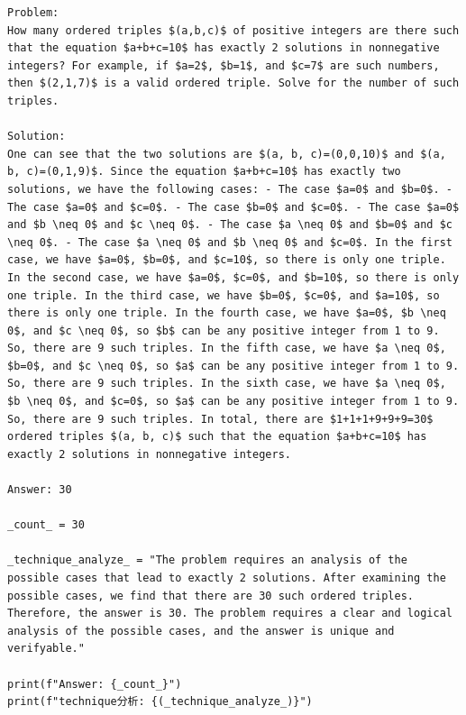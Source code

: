 \documentclass[11pt]{article}
\begin{document}
\begin{Verbatim}[breaklines=true,breakanywhere=true,fontsize=\small]
Problem:
How many ordered triples $(a,b,c)$ of positive integers are there such that the equation $a+b+c=10$ has exactly 2 solutions in nonnegative integers? For example, if $a=2$, $b=1$, and $c=7$ are such numbers, then $(2,1,7)$ is a valid ordered triple. Solve for the number of such triples.

Solution:
One can see that the two solutions are $(a, b, c)=(0,0,10)$ and $(a, b, c)=(0,1,9)$. Since the equation $a+b+c=10$ has exactly two solutions, we have the following cases: - The case $a=0$ and $b=0$. - The case $a=0$ and $c=0$. - The case $b=0$ and $c=0$. - The case $a=0$ and $b \neq 0$ and $c \neq 0$. - The case $a \neq 0$ and $b=0$ and $c \neq 0$. - The case $a \neq 0$ and $b \neq 0$ and $c=0$. In the first case, we have $a=0$, $b=0$, and $c=10$, so there is only one triple. In the second case, we have $a=0$, $c=0$, and $b=10$, so there is only one triple. In the third case, we have $b=0$, $c=0$, and $a=10$, so there is only one triple. In the fourth case, we have $a=0$, $b \neq 0$, and $c \neq 0$, so $b$ can be any positive integer from 1 to 9. So, there are 9 such triples. In the fifth case, we have $a \neq 0$, $b=0$, and $c \neq 0$, so $a$ can be any positive integer from 1 to 9. So, there are 9 such triples. In the sixth case, we have $a \neq 0$, $b \neq 0$, and $c=0$, so $a$ can be any positive integer from 1 to 9. So, there are 9 such triples. In total, there are $1+1+1+9+9+9=30$ ordered triples $(a, b, c)$ such that the equation $a+b+c=10$ has exactly 2 solutions in nonnegative integers.

Answer: 30

_count_ = 30

_technique_analyze_ = "The problem requires an analysis of the possible cases that lead to exactly 2 solutions. After examining the possible cases, we find that there are 30 such ordered triples. Therefore, the answer is 30. The problem requires a clear and logical analysis of the possible cases, and the answer is unique and verifyable."

print(f"Answer: {_count_}")
print(f"technique分析: {(_technique_analyze_)}")


\end{Verbatim}
\end{document}

